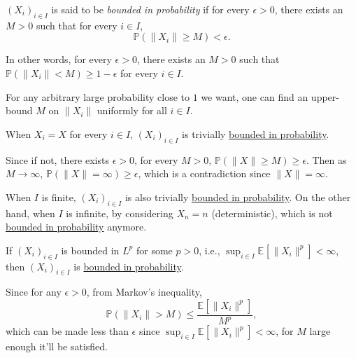 \begin{definition}\label{def:bounded-in-probability}
	\((X_i)_{i \in I}\) is said to be \emph{bounded in probability} if for every \(\epsilon > 0\), there exists an \(M > 0\) such that for every \(i \in I\),
	\[
		\mathbb{P} (\lVert X_i \rVert \geq M) < \epsilon .
	\]
\end{definition}

In other words, for every \(\epsilon > 0\), there exists an \(M > 0\) such that \(\mathbb{P} (\lVert X_i \rVert < M) \geq 1 - \epsilon\) for every \(i \in I\).

\begin{intuition}
	For any arbitrary large probability close to \(1\) we want, one can find an upper-bound \(M\) on \(\lVert X_i \rVert \) uniformly for all \(i \in I\).
\end{intuition}

\begin{note}
	When \(X_i = X\) for every \(i \in I\), \((X_i)_{i \in I}\) is trivially \hyperref[def:bounded-in-probability]{bounded in probability}.
\end{note}
\begin{explanation}
	Since if not, there exists \(\epsilon > 0\), for every \(M > 0\), \(\mathbb{P} (\lVert X \rVert \geq M) \geq \epsilon \). Then as \(M \to \infty \), \(\mathbb{P} (\lVert X \rVert = \infty ) \geq \epsilon \), which is a contradiction since \(\lVert X \rVert = \infty \).
\end{explanation}

\begin{remark}
	When \(I\) is finite, \((X_i)_{i \in I}\) is also trivially \hyperref[def:bounded-in-probability]{bounded in probability}. On the other hand, when \(I\) is infinite, by considering \(X_n = n\) (deterministic), which is not \hyperref[def:bounded-in-probability]{bounded in probability} anymore.
\end{remark}

\begin{remark}
	If \((X_i)_{i \in I}\) is bounded in \(L^p\) for some \(p > 0\), i.e., \(\sup _{i \in I} \mathbb{E}_{}\left[\lVert X_i \rVert ^p \right] < \infty \), then \((X_i)_{i \in I}\) is \hyperref[def:bounded-in-probability]{bounded in probability}.
\end{remark}
\begin{explanation}
	Since for any \(\epsilon > 0\), from Markov's inequality,
	\[
		\mathbb{P} (\lVert X_i \rVert > M)
		\leq \frac{\mathbb{E}_{}\left[\lVert X_i \rVert ^p \right] }{M^p},
	\]
	which can be made less than \(\epsilon \) since \(\sup _{i \in I} \mathbb{E}_{}\left[\lVert X_i \rVert ^p \right] < \infty \), for \(M\) large enough it'll be satisfied.
\end{explanation}

